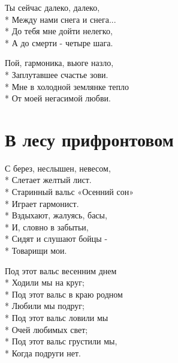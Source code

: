 \medskip

\begin{minipage}{\linewidth}
Ты сейчас далеко, далеко,\\*
Между нами снега и снега...\\*
До тебя мне дойти нелегко,\\*
А до смерти - четыре шага.\\
\end{minipage}\par\medskip\nobreak

\medskip

\begin{minipage}{\linewidth}
Пой, гармоника, вьюге назло,\\*
Заплутавшее счастье зови.\\*
Мне в холодной землянке тепло\\*
От моей негасимой любви. \\
\end{minipage}

\vspace{\fill}\newpage

\section{В лесу прифронтовом}
\label{song:В_лесу_прифронтовом}

\medskip

\begin{minipage}{\linewidth}
С берез, неслышен, невесом,\\*
Слетает желтый лист.\\*
Старинный вальс «Осенний сон»\\*
Играет гармонист.\\*
Вздыхают, жалуясь, басы,\\*
И, словно в забытьи,\\*
Сидят и слушают бойцы -\\*
Товарищи мои.\\
\end{minipage}\par\medskip\nobreak

\medskip

\begin{minipage}{\linewidth}
Под этот вальс весенним днем\\*
Ходили мы на круг;\\*
Под этот вальс в краю родном\\*
Любили мы подруг;\\*
Под этот вальс ловили мы\\*
Очей любимых свет;\\*
Под этот вальс грустили мы,\\*
Когда подруги нет.\\
\end{minipage}\par\medskip\nobreak

